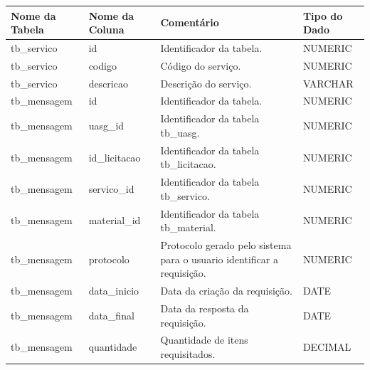 \begin{landscape}
	\begin{table}[ht]
		\centering
		\begin{tabular}{|l|l|l|l|}
				\hline
			Nome da Tabela & Nome da Coluna            & Comentário                                                             & Tipo do Dado \\ \hline
			tb\_servico    & id                        & Identificador da tabela.                                               & NUMERIC      \\ \hline
			tb\_servico    & codigo                    & Código do serviço.                                                     & NUMERIC      \\ \hline
			tb\_servico    & descricao                 & Descrição do serviço.                                                  & VARCHAR      \\ \hline
			tb\_mensagem   & id                        & Identificador da tabela.                                               & NUMERIC      \\ \hline
			tb\_mensagem   & uasg\_id                  & Identificador da tabela tb\_uasg.                                      & NUMERIC      \\ \hline
			tb\_mensagem   & id\_licitacao             & Identificador da tabela tb\_licitacao.                                 & NUMERIC      \\ \hline
			tb\_mensagem   & servico\_id               & Identificador da tabela tb\_servico.                                   & NUMERIC      \\ \hline
			tb\_mensagem   & material\_id              & Identificador da tabela tb\_material.                                  & NUMERIC      \\ \hline
			tb\_mensagem   & protocolo                 & Protocolo gerado pelo sistema para o usuario identificar a requisição. & NUMERIC      \\ \hline
			tb\_mensagem   & data\_inicio              & Data da criação da requisição.                                         & DATE         \\ \hline
			tb\_mensagem   & data\_final               & Data da resposta da requisição.                                        & DATE         \\ \hline
			tb\_mensagem   & quantidade                & Quantidade de itens requisitados.                                      & DECIMAL      \\ \hline

\end{tabular}
\end{table}
\end{landscape}
